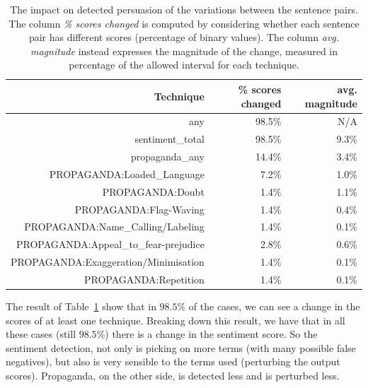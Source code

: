 \begin{table}[!htbp]
    \centering
    \begin{tabular}{r|rr}
         Technique & \% scores changed & avg. magnitude \\
         \hline
         any & 98.5\% & N/A \\
        sentiment\_total & 98.5\% & 9.3\% \\
        propaganda\_any & 14.4\% & 3.4\% \\
        PROPAGANDA:Loaded\_Language & 7.2\% & 1.0\% \\
        PROPAGANDA:Doubt & 1.4\% & 1.1\% \\
        PROPAGANDA:Flag-Waving & 1.4\% & 0.4\% \\
        PROPAGANDA:Name\_Calling/Labeling & 1.4\% & 0.1\% \\
        PROPAGANDA:Appeal\_to\_fear-prejudice & 2.8\% & 0.6\% \\
        PROPAGANDA:Exaggeration/Minimisation & 1.4\% & 0.1\% \\
        PROPAGANDA:Repetition & 1.4\% & 0.1\% \\
    \end{tabular}
    \caption{The impact on detected persuasion of the variations between the sentence pairs. The column \textit{\% scores changed} is computed by considering whether each sentence pair has different scores (percentage of binary values). The column \textit{avg. magnitude} instead expresses the magnitude of the change, measured in percentage of the allowed interval for each technique.}
    \label{tab:change_scores_persuasion_in_variations}
\end{table}

The result of Table~\ref{tab:change_scores_persuasion_in_variations} show that in $98.5\%$ of the cases, we can see a change in the scores of at least one technique.
Breaking down this result, we have that in all these cases (still $98.5\%$) there is a change in the sentiment score. So the sentiment detection, not only is picking on more terms (with many possible false negatives), but also is very sensible to the terms used (perturbing the output scores).
Propaganda, on the other side, is detected less and is perturbed less.

